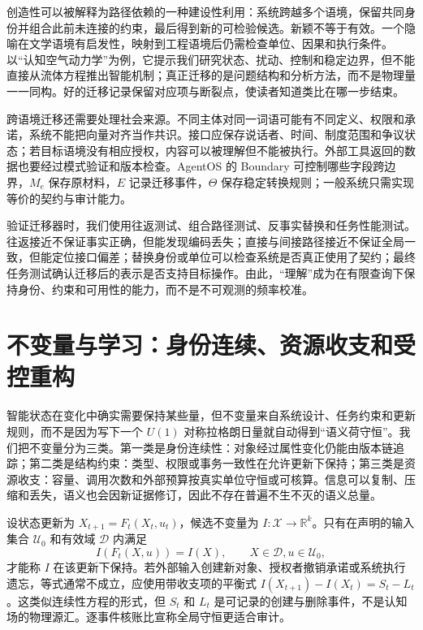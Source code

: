 创造性可以被解释为路径依赖的一种建设性利用：系统跨越多个语境，保留共同身份并组合此前未连接的约束，最后得到新的可检验候选。新颖不等于有效。一个隐喻在文学语境有启发性，映射到工程语境后仍需检查单位、因果和执行条件。以“认知空气动力学”为例，它提示我们研究状态、扰动、控制和稳定边界，但不能直接从流体方程推出智能机制；真正迁移的是问题结构和分析方法，而不是物理量一一同构。好的迁移记录保留对应项与断裂点，使读者知道类比在哪一步结束。

跨语境迁移还需要处理社会来源。不同主体对同一词语可能有不同定义、权限和承诺，系统不能把向量对齐当作共识。接口应保存说话者、时间、制度范围和争议状态；若目标语境没有相应授权，内容可以被理解但不能被执行。外部工具返回的数据也要经过模式验证和版本检查。AgentOS 的 Boundary 可控制哪些字段跨边界，$M_e$ 保存原材料，$E$ 记录迁移事件，$\Theta$ 保存稳定转换规则；一般系统只需实现等价的契约与审计能力。

验证迁移器时，我们使用往返测试、组合路径测试、反事实替换和任务性能测试。往返接近不保证事实正确，但能发现编码丢失；直接与间接路径接近不保证全局一致，但能定位接口偏差；替换身份或单位可以检查系统是否真正使用了契约；最终任务测试确认迁移后的表示是否支持目标操作。由此，“理解”成为在有限查询下保持身份、约束和可用性的能力，而不是不可观测的频率校准。

\section{不变量与学习：身份连续、资源收支和受控重构}
\label{sec:noether_semantion_dynamics}

智能状态在变化中确实需要保持某些量，但不变量来自系统设计、任务约束和更新规则，而不是因为写下一个 $U(1)$ 对称拉格朗日量就自动得到“语义荷守恒”。我们把不变量分为三类。第一类是身份连续性：对象经过属性变化仍能由版本链追踪；第二类是结构约束：类型、权限或事务一致性在允许更新下保持；第三类是资源收支：容量、调用次数和外部预算按真实单位守恒或可核算。信息可以复制、压缩和丢失，语义也会因新证据修订，因此不存在普遍不生不灭的语义总量。

设状态更新为 $X_{t+1}=F_t(X_t,u_t)$，候选不变量为 $I:\mathcal X\to\mathbb R^k$。只有在声明的输入集合 $\mathcal U_0$ 和有效域 $\mathcal D$ 内满足
\begin{equation}
 I(F_t(X,u))=I(X),\qquad X\in\mathcal D, u\in\mathcal U_0,
\end{equation}
才能称 $I$ 在该更新下保持。若外部输入创建新对象、授权者撤销承诺或系统执行遗忘，等式通常不成立，应使用带收支项的平衡式 $I(X_{t+1})-I(X_t)=S_t-L_t$。这类似连续性方程的形式，但 $S_t$ 和 $L_t$ 是可记录的创建与删除事件，不是认知场的物理源汇。逐事件核账比宣称全局守恒更适合审计。

